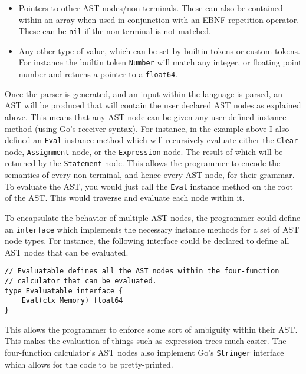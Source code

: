 \begin{itemize}
    \item Pointers to other AST nodes/non-terminals. These can also be contained within an array when used in conjunction with an EBNF repetition operator. These can be \texttt{nil} if the non-terminal is not matched.
    \item Any other type of value, which can be set by builtin tokens or custom tokens. For instance the builtin token \verb|Number| will match any integer, or floating point number and returns a pointer to a \texttt{float64}.
\end{itemize}

Once the parser is generated, and an input within the language is parsed, an AST will be produced that will contain the user declared AST nodes as explained above. This means that any AST node can be given any user defined instance method (using Go's receiver syntax). For instance, in the \hyperref[fig:four-func-calc-statement-ast-node]{example above} I also defined an \verb|Eval| instance method which will recursively evaluate either the \verb|Clear| node, \verb|Assignment| node, or the \verb|Expression| node. The result of which will be returned by the \verb|Statement| node. This allows the programmer to encode the semantics of every non-terminal, and hence every AST node, for their grammar. To evaluate the AST, you would just call the \verb|Eval| instance method on the root of the AST. This would traverse and evaluate each node within it.

To encapsulate the behavior of multiple AST nodes, the programmer could define an \texttt{interface} which implements the necessary instance methods for a set of AST node types. For instance, the following interface could be declared to define all AST nodes that can be evaluated.

\begin{verbatim}
// Evaluatable defines all the AST nodes within the four-function 
// calculator that can be evaluated.
type Evaluatable interface {
    Eval(ctx Memory) float64
}
\end{verbatim}

This allows the programmer to enforce some sort of ambiguity within their AST. This makes the evaluation of things such as expression trees much easier. The four-function calculator's AST nodes also implement Go's \texttt{Stringer} interface which allows for the code to be pretty-printed.

